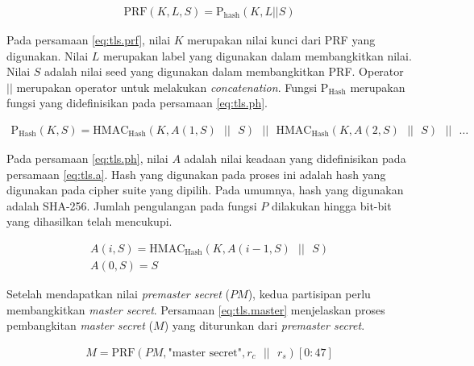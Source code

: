 \begin{equation}
  \label{eq:tls.prf}
  \begin{array}{l}   
    \text{PRF}(K, L, S) = \text{P}_\text{hash}(K, L || S)
  \end{array}
\end{equation}

Pada persamaan \ref{eq:tls.prf}, nilai $K$ merupakan nilai kunci dari PRF yang digunakan. Nilai $L$ merupakan label yang digunakan dalam membangkitkan nilai. Nilai $S$ adalah nilai seed yang digunakan dalam membangkitkan PRF. Operator $||$ merupakan operator untuk melakukan \emph{concatenation}. Fungsi $\text{P}_\text{Hash}$ merupakan fungsi yang didefinisikan pada persamaan \ref{eq:tls.ph}.

\begin{equation}
  \label{eq:tls.ph}
  \begin{array}{l}   
    \text{P}_\text{Hash}(K, S) = \text{HMAC}_\text{Hash}(K, A(1, S)\text{ }||\text{ }S)\text{ }||\text{ }
        \text{HMAC}_\text{Hash}(K, A(2, S)\text{ }||\text{ }S)\text{ }||\text{ }\ldots
  \end{array}
\end{equation}

Pada persamaan \ref{eq:tls.ph}, nilai $A$ adalah nilai keadaan yang didefinisikan pada persamaan \ref{eq:tls.a}. Hash yang digunakan pada proses ini adalah hash yang digunakan pada cipher suite yang dipilih. Pada umumnya, hash yang digunakan adalah SHA-256. Jumlah pengulangan pada fungsi $P$ dilakukan hingga bit-bit yang dihasilkan telah mencukupi.

\begin{equation}
  \label{eq:tls.a}
  \begin{array}{l}   
    A(i, S) = \text{HMAC}_\text{Hash}(K, A(i-1, S)\text{ }||\text{ }S) \\
    A(0, S) = S
  \end{array}
\end{equation}

Setelah mendapatkan nilai \emph{premaster secret} ($PM$), kedua partisipan perlu membangkitkan \emph{master secret}. Persamaan \ref{eq:tls.master} menjelaskan proses pembangkitan \emph{master secret} ($M$) yang diturunkan dari \emph{premaster secret}.

\begin{equation}
  \label{eq:tls.master}
  \begin{array}{l}
    M = \text{PRF}(PM, \text{"master secret"}, r_c \text{ }||\text{ }r_s)[0:47]
  \end{array}
\end{equation}

